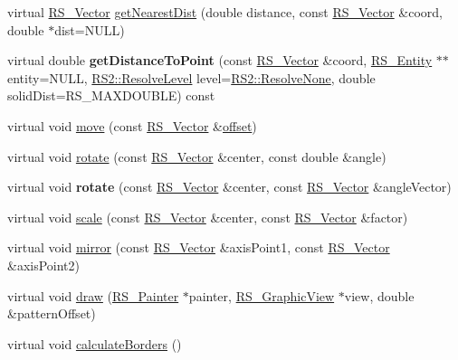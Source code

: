 \begin{DoxyCompactItemize}
\item 
virtual \hyperlink{classRS__Vector}{R\-S\-\_\-\-Vector} \hyperlink{classRS__Point_aae95eb097be89453c9eb228679357180}{get\-Nearest\-Dist} (double distance, const \hyperlink{classRS__Vector}{R\-S\-\_\-\-Vector} \&coord, double $\ast$dist=N\-U\-L\-L)
\item 
\hypertarget{classRS__Point_a05a2b782043adff1576124cb80b83735}{virtual double {\bfseries get\-Distance\-To\-Point} (const \hyperlink{classRS__Vector}{R\-S\-\_\-\-Vector} \&coord, \hyperlink{classRS__Entity}{R\-S\-\_\-\-Entity} $\ast$$\ast$entity=N\-U\-L\-L, \hyperlink{classRS2_a1b2c5e3a3e9d1b03a9564229255faa20}{R\-S2\-::\-Resolve\-Level} level=\hyperlink{classRS2_a1b2c5e3a3e9d1b03a9564229255faa20aecb7396f39bc313ad8903c8a5fac5a50}{R\-S2\-::\-Resolve\-None}, double solid\-Dist=R\-S\-\_\-\-M\-A\-X\-D\-O\-U\-B\-L\-E) const }\label{classRS__Point_a05a2b782043adff1576124cb80b83735}

\item 
virtual void \hyperlink{classRS__Point_a40f8570a98d1d85518b72b20e0b1e315}{move} (const \hyperlink{classRS__Vector}{R\-S\-\_\-\-Vector} \&\hyperlink{classRS__AtomicEntity_ab708a0d05c11fd7eff646243db60464a}{offset})
\item 
virtual void \hyperlink{classRS__Point_a140764baee1424be943f0f01d8a71442}{rotate} (const \hyperlink{classRS__Vector}{R\-S\-\_\-\-Vector} \&center, const double \&angle)
\item 
\hypertarget{classRS__Point_a53627989406b6710133fd89bc5c1e624}{virtual void {\bfseries rotate} (const \hyperlink{classRS__Vector}{R\-S\-\_\-\-Vector} \&center, const \hyperlink{classRS__Vector}{R\-S\-\_\-\-Vector} \&angle\-Vector)}\label{classRS__Point_a53627989406b6710133fd89bc5c1e624}

\item 
virtual void \hyperlink{classRS__Point_a2e7690bae69dcde5fea70adca1e81055}{scale} (const \hyperlink{classRS__Vector}{R\-S\-\_\-\-Vector} \&center, const \hyperlink{classRS__Vector}{R\-S\-\_\-\-Vector} \&factor)
\item 
virtual void \hyperlink{classRS__Point_aa208a36e0af3739407a713ca37e99f7c}{mirror} (const \hyperlink{classRS__Vector}{R\-S\-\_\-\-Vector} \&axis\-Point1, const \hyperlink{classRS__Vector}{R\-S\-\_\-\-Vector} \&axis\-Point2)
\item 
virtual void \hyperlink{classRS__Point_adb2b430dd55ce203e385a7fc650661ef}{draw} (\hyperlink{classRS__Painter}{R\-S\-\_\-\-Painter} $\ast$painter, \hyperlink{classRS__GraphicView}{R\-S\-\_\-\-Graphic\-View} $\ast$view, double \&pattern\-Offset)
\item 
virtual void \hyperlink{classRS__Point_aba85906eb9e3c14bfa42e40f89450d3e}{calculate\-Borders} ()
\end{DoxyCompactItemize}
